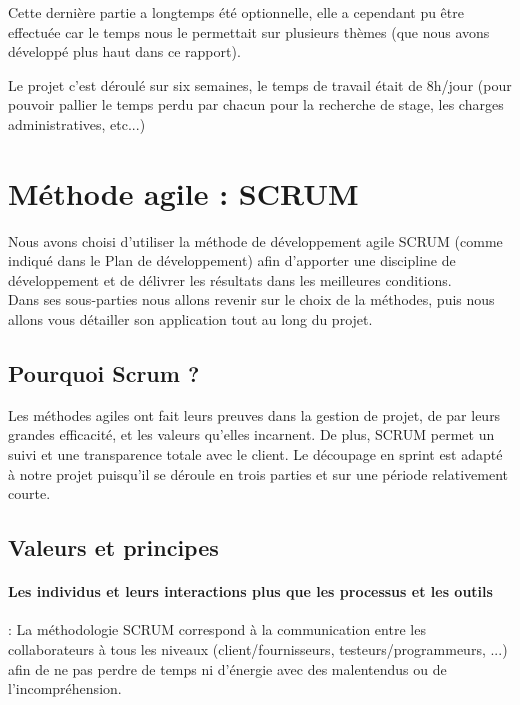 Cette dernière partie a longtemps été optionnelle, elle a cependant pu être effectuée car le temps nous le permettait sur plusieurs thèmes (que nous avons développé plus haut dans ce rapport).

Le projet c'est déroulé sur six semaines, le temps de travail était de 8h/jour (pour pouvoir pallier le temps perdu par chacun pour la recherche de stage, les charges administratives, etc...)

\section{Méthode agile : SCRUM}

Nous avons choisi d'utiliser la méthode de développement agile SCRUM (comme indiqué dans le Plan de développement) afin d'apporter une discipline de développement et de délivrer les résultats dans les meilleures conditions.\\
Dans ses sous-parties nous allons revenir sur le choix de la méthodes, puis nous allons vous détailler son application tout au long du projet.

\subsection{Pourquoi Scrum ?}

Les méthodes agiles ont fait leurs preuves dans la gestion de projet, de par leurs grandes efficacité, et les valeurs qu'elles incarnent. De plus, SCRUM permet un suivi et une transparence totale avec le client. Le découpage en sprint est adapté à notre projet puisqu'il se déroule en trois parties et sur une période relativement courte.

\subsection{Valeurs et principes}

\paragraph{Les individus et leurs interactions plus que les processus et les outils} : La méthodologie SCRUM correspond à la communication entre les collaborateurs à tous les niveaux (client/fournisseurs, testeurs/programmeurs, ...) afin de ne pas perdre de temps ni d'énergie avec des malentendus ou de l'incompréhension.\\

